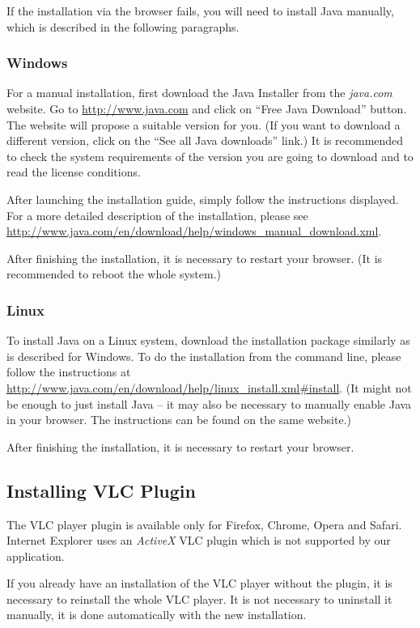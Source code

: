 If the installation via the browser fails, you will need to install Java manually, which is described in the following paragraphs.

\subsubsection{Windows}

For a manual installation, first download the Java Installer from the \emph{java.com} website. Go to \url{http://www.java.com} and click on ``Free Java Download'' button. The website will propose a suitable version for you. (If you want to download a different version, click on the ``See all Java downloads'' link.) It is recommended to check the system requirements of the version you are going to download and to read the license conditions.

After launching the installation guide, simply follow the instructions displayed. For a more detailed description of the installation, please see \url{http://www.java.com/en/download/help/windows_manual_download.xml}.

After finishing the installation, it is necessary to restart your browser.
(It is recommended to reboot the whole system.)

\subsubsection{Linux}

To install Java on a Linux system, download the installation package similarly as is described for Windows. To do the installation from the command line, please follow the instructions at \url{http://www.java.com/en/download/help/linux_install.xml#install}. (It might not be enough to just install Java -- it may also be necessary to manually enable Java in your browser. The instructions can be found on the same website.)

After finishing the installation, it is necessary to restart your browser.

\subsection{Installing VLC Plugin}

The VLC player plugin is available only for Firefox, Chrome, Opera and Safari. Internet Explorer uses an \emph{ActiveX} VLC plugin which is not supported by our application.

If you already have an installation of the VLC player without the plugin, it is necessary to reinstall the whole VLC player. It is not necessary to uninstall it manually, it is done automatically with the new installation.

